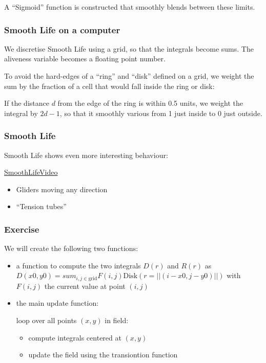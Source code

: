A ``Sigmoid'' function is constructed that smoothly blends between these
limits.

\subsubsection{Smooth Life on a
computer}\label{smooth-life-on-a-computer}

We discretise Smooth Life using a grid, so that the integrals become
sums. The aliveness variable becomes a floating point number.

To avoid the hard-edges of a ``ring'' and ``disk'' defined on a grid, we
weight the sum by the fraction of a cell that would fall inside the ring
or disk:

If the distance $d$ from the edge of the ring is within 0.5 units, we
weight the integral by $2d-1$, so that it smoothly various from 1 just
inside to 0 just outside.

\subsubsection{Smooth Life}\label{smooth-life-3}

Smooth Life shows even more interesting behaviour:

\href{https://www.youtube.com/watch?v=KJe9H6qS82I}{SmoothLifeVideo}

\begin{itemize}
\itemsep1pt\parskip0pt
\item
  Gliders moving any direction
\item
  ``Tension tubes''
\end{itemize}

\subsubsection{Exercise}\label{exercise}

We will create the following two functions:

\begin{itemize}
\item
  a function to compute the two integrals $D(r)$ and $R(r)$ as
  $D(x0, y0) = sum_{i, j \in \mathrm{grid}} F(i, j) \mathrm{Disk}(r=||(i - x0, j - y0)||)$
  with $F(i, j)$ the current value at point $(i, j)$
\item
  the main update function:

  loop over all points $(x, y)$ in field:

  \begin{itemize}
  \itemsep1pt\parskip0pt
  \item
    compute integrals centered at $(x, y)$
  \item
    update the field using the transiontion function
  \end{itemize}
\end{itemize}

